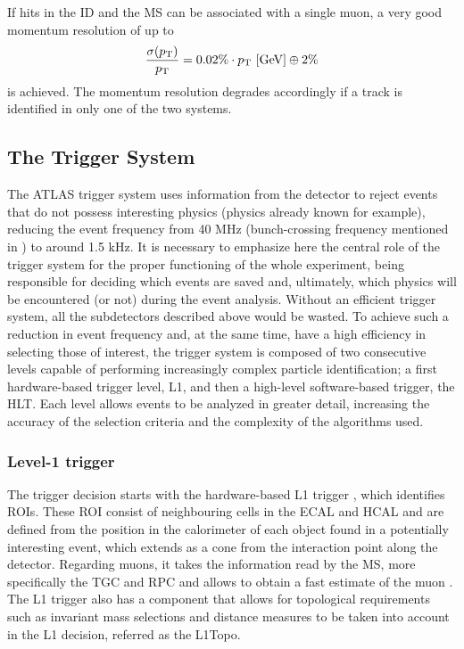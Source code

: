 If hits in the \ac{ID} and the \ac{MS} can be associated with a single muon, a very good momentum resolution of up to
\begin{equation}
    \frac{\sigma(p_{\text{T}})}{p_{\text{T}}} = 
    0.02\% \cdot p_{\text{T}}~[\text{GeV}] \oplus 2\%
\end{equation}
is achieved. The momentum resolution degrades accordingly if a track is identified in only one of the two systems.






\subsection{The Trigger System}



The \ac{ATLAS} trigger system \cite{PerformanceTrigger2010,PerformanceTrigger2015,PerformanceTriggerRun2} uses information from the detector to reject events that do not possess interesting physics (physics already known for example), reducing the event frequency from 40 MHz (bunch-crossing frequency mentioned in \Sect{\ref{sec:atlas:LHC}}) to around 1.5 kHz. It is necessary to emphasize here the central role of the trigger system for the proper functioning of the whole experiment, being responsible for deciding which events are saved and, ultimately, which physics will be encountered (or not) during the event analysis. Without an efficient trigger system, all the subdetectors described above would be wasted. To achieve such a reduction in event frequency and, at the same time, have a high efficiency in selecting those of interest, the trigger system is composed of two consecutive levels capable of performing increasingly complex particle identification; a first hardware-based trigger level, \ac{L1}, and then a high-level software-based trigger, the \ac{HLT}. Each level allows events to be analyzed in greater detail, increasing the accuracy of the selection criteria and the complexity of the algorithms used.


\subsubsection{Level-1 trigger}

The trigger decision starts with the hardware-based \ac{L1} trigger \cite{ATLASL1Trigger}, which identifies \acp{ROI}. These \ac{ROI} consist of neighbouring cells in the \ac{ECAL} and \ac{HCAL} and are defined from the position in the calorimeter of each object found in a potentially interesting event, which extends as a cone from the interaction point along the detector.
Regarding muons, it takes the information read by the \ac{MS}, more specifically the \ac{TGC} and \ac{RPC} and allows to obtain a fast estimate of the muon \pt.
The \ac{L1} trigger also has a component that allows for topological requirements such as invariant mass selections and distance measures to be taken into account in the \ac{L1} decision, referred as the \ac{L1Topo}.

